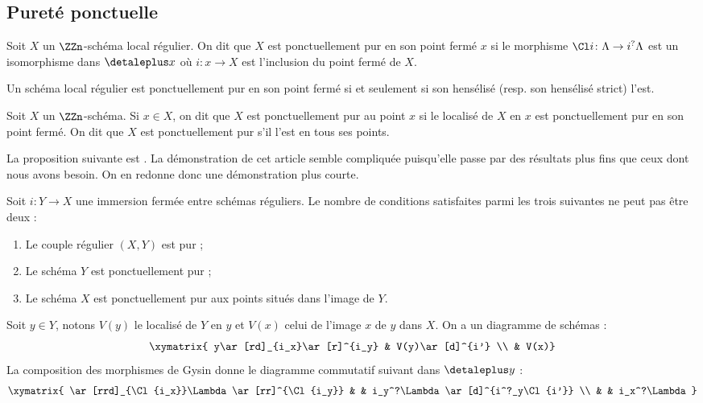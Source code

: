 \documentclass[10pt]{../fichiers-configuration-latex/smfart}
\begin{document}
\subsection{Pureté ponctuelle}%
\label{16-subsection-purete-ponctuelle}

\begin{definition2}
Soit $X$ un $\ZZn$-schéma local régulier.
On dit que $X$ est ponctuellement pur en
son point fermé $x$ si le morphisme $\Cl i\colon \Lambda\to i^?\Lambda$
est un isomorphisme dans $\detaleplus x$ où $i\colon x\to X$ est
l'inclusion du point fermé de $X$.
\end{definition2}

Un schéma local régulier est ponctuellement pur en son point fermé si et
seulement si son hensélisé (resp. son hensélisé strict) l'est.

\begin{definition2}
Soit $X$ un $\ZZn$-schéma. Si $x\in X$, on dit que $X$ est ponctuellement
pur au point $x$ si le localisé de $X$ en $x$ est ponctuellement pur en son
point fermé. On dit que $X$ est ponctuellement pur s'il l'est en tous ses
points.
\end{definition2}

La proposition suivante est \cite[proposition~2.2.4]{AZUMINO@Fujiwara}. La
démonstration de cet article semble compliquée puisqu'elle passe par des
résultats plus fins que ceux dont nous avons besoin. On en redonne donc
une démonstration plus courte.

\begin{proposition2}\label{16-proposition-deux-sur-trois}
Soit $i\colon Y\to X$ une immersion fermée entre schémas réguliers. Le
nombre de conditions satisfaites parmi les trois suivantes ne peut pas être
deux :
\begin{enumerate}
\item[(a)] Le couple régulier $(X,Y)$ est pur ;
\item[(b)] Le schéma $Y$ est ponctuellement pur ;
\item[(c)] Le schéma $X$
est ponctuellement pur aux points situés dans l'image de $Y$.
\end{enumerate}
\end{proposition2}

Soit $y\in Y$, notons $V(y)$ le localisé de $Y$ en $y$ et $V(x)$ celui de
l'image $x$ de $y$ dans $X$. On a un diagramme de schémas :
\[
\xymatrix{
y\ar[rd]_{i_x}\ar[r]^{i_y} & V(y)\ar[d]^{i'} \\
& V(x)}
\]
La composition des morphismes de Gysin donne le diagramme commutatif
suivant dans $\detaleplus y$ :
\[
\xymatrix{
\ar[rrd]_{\Cl {i_x}}\Lambda\ar[rr]^{\Cl {i_y}}
&   & i_y^?\Lambda\ar[d]^{i^?_y\Cl {i'}} \\
&  & i_x^?\Lambda}
\]
\end{document}
